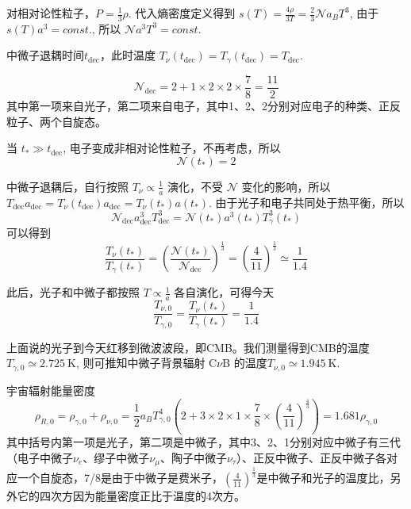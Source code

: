 \documentclass[12pt]{ctexart}
\begin{document}
对相对论性粒子，$P=\frac{1}{3}\rho$.
代入熵密度定义得到
$s(T) = \frac{4\rho}{3T} = \frac{2}{3} \mathcal{N} a_B T^3$,
由于$s(T) a^3 = const.$,
所以 
$\mathcal{N} a^3 T^3 = const.$

中微子退耦时间$t_\text{dec}$，此时温度 $T_\nu(t_\text{dec}) = T_\gamma(t_\text{dec}) = T_\text{dec}$.

\begin{equation}
    \mathcal{N}_\text{dec} = 2+ 1\times 2\times 2\times \frac{7}{8} = \frac{11}{2}
\end{equation}
其中第一项来自光子，第二项来自电子，其中1、2、2分别对应电子的种类、正反粒子、两个自旋态。

当 $t_* \gg t_\text{dec}$, 电子变成非相对论性粒子，不再考虑，所以
\begin{equation}
    \mathcal{N}(t_*) = 2
\end{equation}

中微子退耦后，自行按照 $T_\nu \propto \frac{1}{a}$ 演化，不受 $\mathcal{N}$ 变化的影响，所以
$T_\text{dec} a_\text{dec} = T_\nu (t_\text{dec}) a_\text{dec} = T_\nu(t_*) a(t_*)$.
由于光子和电子共同处于热平衡，所以 
\begin{equation}
    \mathcal{N}_\text{dec} a_\text{dec}^3 T_\text{dec}^3 = \mathcal{N}(t_*) a^3(t_*) T_\gamma^3(t_*)
\end{equation}
可以得到
\begin{equation}
    \frac{T_\nu(t_*)}{T_\gamma(t_*)} = \left(\frac{\mathcal{N}(t_*)}{\mathcal{N}_\text{dec}}\right)^\frac{1}{3} = \left(\frac{4}{11}\right)^\frac{1}{3} \simeq \frac{1}{1.4} 
\end{equation}

此后，光子和中微子都按照 $T\propto \frac{1}{a}$ 各自演化，可得今天
\begin{equation}
    \frac{T_{\nu,0}}{T_{\gamma,0}} = \frac{T_\nu(t_*)}{T_\gamma(t_*)} = \frac{1}{1.4}
\end{equation}

上面说的光子到今天红移到微波波段，即CMB。我们测量得到CMB的温度 $T_{\gamma,0}\simeq 2.725 \mathrm{~K}$, 则可推知中微子背景辐射 C$\nu$B 的温度$T_{\nu,0} \simeq 1.945 \mathrm{~K}$.

宇宙辐射能量密度
\begin{equation}
    \rho_{R,0} = \rho_{\gamma,0} + \rho_{\nu,0} = \frac{1}{2} a_B T_{\gamma,0}^4 \left(2+ 3\times 2\times 1\times\frac{7}{8} \times \left(\frac{4}{11}\right)^\frac{4}{3} \right) = 1.681 \rho_{\gamma,0}
\end{equation}
其中括号内第一项是光子，第二项是中微子，其中3、2、1分别对应中微子有三代（电子中微子$\nu_e$、缪子中微子$\nu_\mu$、陶子中微子$\nu_\tau$）、正反中微子、正反中微子各对应一个自旋态，7/8是由于中微子是费米子，$\left(\frac{4}{11}\right)^\frac{1}{3}$是中微子和光子的温度比，另外它的四次方因为能量密度正比于温度的4次方。
\end{document}
